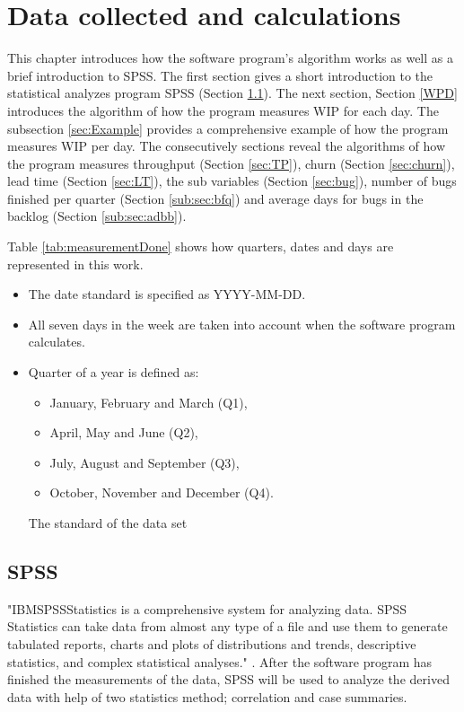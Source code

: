 \documentclass[UKenglish]{ifimaster}  %
\begin{document}
\chapter{Data collected and calculations}
\label{ch:DCC}
This chapter introduces how the software program's algorithm works as well as a brief introduction to SPSS.  The first section gives a short introduction to the statistical analyzes program SPSS  (Section \ref{sec:SPSS}). The next section, Section \ref{WPD} introduces the algorithm of how the program measures WIP for each day. The subsection \ref{sec:Example} provides a comprehensive example of how the program measures WIP per day. The consecutively sections reveal the algorithms of how the program measures  throughput (Section \ref{sec:TP}),  churn (Section \ref{sec:churn}),  lead time (Section \ref{sec:LT}), the sub variables (Section \ref{sec:bug}), number of bugs finished per quarter (Section  \ref{sub:sec:bfq}) and average days for bugs in the backlog (Section \ref{sub:sec:adbb}). 

Table \ref{tab:measurementDone} shows how quarters, dates and days are represented in this work. 

\begin{table}[!ht]
\centering
\begin{itemize}
\item The date standard is specified as YYYY-MM-DD.
\item All seven days in the week are taken into account when the software program calculates.
\item Quarter of a year is defined as: 
\begin{itemize}
\item January, February and March (Q1),
\item April, May and June (Q2),
\item July, August and September (Q3),
\item October, November and December (Q4).
\end{itemize}
\parencite{Quarter}
\caption{The standard of the data set}
\label{tab:measurementDone}
\end{itemize}
\end{table}



\section{SPSS}
\label{sec:SPSS}
"IBM\circledR  SPSS\circledR Statistics is a comprehensive system for analyzing data. SPSS Statistics can take data from almost any type of a file and use them to generate tabulated reports, charts and plots of distributions and trends, descriptive statistics, and complex statistical analyses." \parencite{IBM}. After the software program has finished the measurements of the data, SPSS will be used to analyze the derived data with help of two statistics method; correlation and case summaries. 
\end{document}
